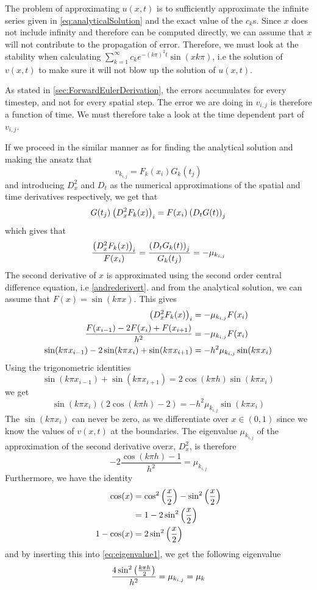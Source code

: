 \documentclass[12pt,english,a4paper]{article}
\begin{document}
The problem of approximating \(u(x,t)\) is to sufficiently approximate the infinite series given in \vref{eq:analyticalSolution} and the exact value of the \(c_k\)s. Since \( x\) does not include infinity and therefore can be computed directly, we can assume that \(x\) will not contribute to the propagation of error. Therefore, we must look at the stability when calculating \( \sum_{k=1}^\infty c_ke^{-(k\pi)^2t}\sin(xk\pi) \), i.e the solution of \(v(x,t)\) to make sure it will not blow up the solution of \(u(x,t)\).

As stated in \vref{sec:ForwardEulerDerivation}, the errors accumulates for every timestep, and not for every spatial step. The error we are doing in \(v_{i,j}\) is therefore a function of time. We must therefore take a look at the time dependent part of \(v_{i,j}\).

If we proceed in the similar manner as for finding the analytical solution and making the ansatz that
\[
v_{k_{i,j}} = F_k(x_i)G_k(t_j)
\]
and introducing \(D_x^2\) and \(D_t\) as the numerical approximations of the spatial and time derivatives respectively, we get that
\[
G(t_j)\:\qty(D_x^2F_k(x))_i = F(x_i)\:\qty(D_tG(t))_j
\]
which gives that
\begin{equation}\label{eq:discreteRatios}
\frac{\qty(D_x^2F_k(x))_i }{ F(x_i)} = \frac{\qty(D_tG_k(t))_j}{G_k(t_j)} = -\mu_{k_{i,j}}
\end{equation}
The second derivative of \(x\) is approximated using the second order central difference equation, i.e \vref{andrederivert}.
and from the analytical solution, we can assume that \(F(x) = \sin(k \pi x)\). This gives
\begin{align*}
\qty(D_x^2F_k(x))_i &= -\mu_{k_{i,j}}F(x_i) \\
\frac{F(x_{i-1}) -2F(x_i) + F(x_{i+1}) }{h^2} &= -\mu_{k_{i,j}}F(x_i) \\
\sin(k\pi x_{i-1}) -2\sin(k\pi x_i) + \sin(k \pi x_{i+1}) &= -h^2\mu_{k_{i,j}}\sin(k \pi x_i)
\end{align*}
Using the trigonometric identities
\[
\sin(k\pi x_{i-1}) + \sin(k\pi x_{i+1}) = 2\cos(k\pi h)\sin(k\pi x_i)
\]
we get
\[
\sin(k\pi x_i)(2\cos(k\pi h) - 2) = -h^2\mu_{k_{i,j}}\sin(k \pi x_i)
\]
The \(\sin(k\pi x_i) \) can never be zero, as we differentiate over \(x \in (0,1) \) since we know the values of \( v(x,t) \) at the boundaries. The eigenvalue \(\mu_{k_{i,j}}\) of the approximation of the second derivative over\(x \), \( D_x^2 \), is therefore
\begin{equation}\label{eq:eigenvalue1}
-2\frac{\cos(k\pi h) - 1}{h^2} =\mu_{k_{i,j}}
\end{equation}
Furthermore, we have the identity
\begin{align*}
\cos(x) &= \cos^2\qty(\frac{x}{2}) - \sin^2\qty(\frac{x}{2}) \\
&= 1- 2\sin^2\qty(\frac{x}{2}) \\
1-\cos(x) &= 2\sin^2\qty(\frac{x}{2})
\end{align*}
and by inserting this into \vref{eq:eigenvalue1}, we get the following eigenvalue
\begin{equation} \label{eq:mu}
\frac{4\sin^2\qty(\frac{k\pi h}{2})}{h^2} =\mu_{k_{i,j}} = \mu_k
\end{equation}
\end{document}
